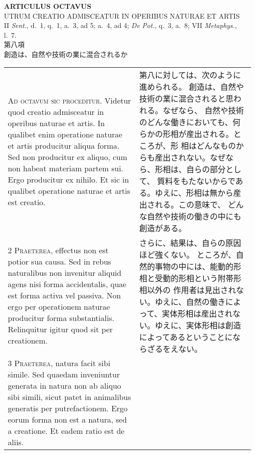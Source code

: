 \documentclass[10pt]{jsarticle} %
\begin{document}
\begin{center}
 {\Large {\bf ARTICULUS OCTAVUS}}\\
 {\large UTRUM CREATIO ADMISCEATUR IN OPERIBUS NATURAE ET ARTIS}\\
 {\footnotesize II {\itshape Sent.}, d.~1, q.~1, a.~3, ad 5; a.~4, ad 4;
 {\itshape De Pot.}, q.~3, a.~8; VII {\itshape Metaphys.}, l.~7.}\\
 {\Large 第八項\\創造は、自然や技術の業に混合されるか}
\end{center}

\begin{longtable}{p{21em}p{21em}}


{\huge A}{\scshape d octavum sic proceditur}. Videtur quod
creatio admisceatur in operibus naturae et artis. In qualibet enim
operatione naturae et artis producitur aliqua forma. Sed non producitur
ex aliquo, cum non habeat materiam partem sui. Ergo producitur ex
nihilo. Et sic in qualibet operatione naturae et artis est creatio.


&

第八に対しては、次のように進められる。
創造は、自然や技術の業に混合されると思われる。なぜなら、
自然や技術のどんな働きにおいても、何らかの形相が産出される。ところが、形
 相はどんなものからも産出されない。なぜなら、形相は、自らの部分として、
 質料をもたないからである。ゆえに、形相は無から産出される。この意味で、
 どんな自然や技術の働きの中にも創造がある。

\\


{\scshape 2 Praeterea}, effectus non est potior sua
causa. Sed in rebus naturalibus non invenitur aliquid agens nisi forma
accidentalis, quae est forma activa vel passiva. Non ergo per
operationem naturae producitur forma substantialis. Relinquitur igitur
quod sit per creationem.


&
さらに、結果は、自らの原因ほど強くない。
ところが、自然的事物の中には、能動的形相と受動的形相という附帯形相以外の
 作用者は見出されない。ゆえに、自然の働きによって、実体形相は産出されな
 い。ゆえに、実体形相は創造によってあるということにならざるをえない。

\\


{\scshape 3 Praeterea}, natura facit sibi simile. Sed
quaedam inveniuntur generata in natura non ab aliquo sibi simili, sicut
patet in animalibus generatis per putrefactionem. Ergo eorum forma non
est a natura, sed a creatione. Et eadem ratio est de aliis.


\end{longtable}
\end{document}
